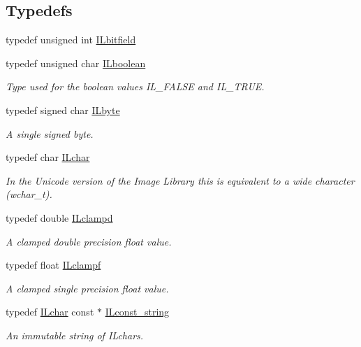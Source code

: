 \subsection*{Typedefs}
\begin{DoxyCompactItemize}
\item 
typedef unsigned int \hyperlink{group__il__types_gae47e67f5430ba6989eaaf6b9a3bc8e87}{I\+Lbitfield}
\item 
typedef unsigned char \hyperlink{group__il__types_gaa6aa7c95cfdc06b4d8601ef832b7bb0a}{I\+Lboolean}
\begin{DoxyCompactList}\small\item\em Type used for the boolean values {\itshape I\+L\+\_\+\+F\+A\+L\+S\+E} and {\itshape I\+L\+\_\+\+T\+R\+U\+E}. \end{DoxyCompactList}\item 
typedef signed char \hyperlink{group__il__types_gae50de507653746ec058ac59a453456b6}{I\+Lbyte}
\begin{DoxyCompactList}\small\item\em A single signed byte. \end{DoxyCompactList}\item 
typedef char \hyperlink{group__il__types_gabb6e047662a2e8131c5bcd785c84ff02}{I\+Lchar}
\begin{DoxyCompactList}\small\item\em In the Unicode version of the Image Library this is equivalent to a wide character ({\itshape wchar\+\_\+t}). \end{DoxyCompactList}\item 
typedef double \hyperlink{group__il__types_ga2cf462921bb7bef1badc94d63f3dbd4d}{I\+Lclampd}
\begin{DoxyCompactList}\small\item\em A clamped double precision float value. \end{DoxyCompactList}\item 
typedef float \hyperlink{group__il__types_gae90d8075bf3ef2cd89c09b26fd4dbef2}{I\+Lclampf}
\begin{DoxyCompactList}\small\item\em A clamped single precision float value. \end{DoxyCompactList}\item 
typedef \hyperlink{group__il__types_gabb6e047662a2e8131c5bcd785c84ff02}{I\+Lchar} const $\ast$ \hyperlink{group__il__types_ga1aa1edc3eb344e14acacb02bade24a5a}{I\+Lconst\+\_\+string}
\begin{DoxyCompactList}\small\item\em An immutable string of {\itshape I\+Lchars}. \end{DoxyCompactList}\item 

\end{DoxyCompactItemize}
